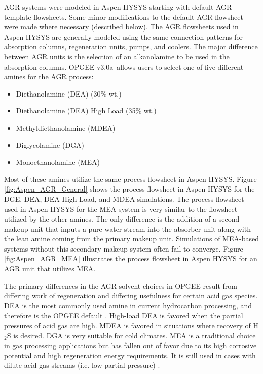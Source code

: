 \documentclass[11pt]{report}
\newcommand{\version}{v3.0a}
\begin{document}
AGR systems were modeled in Aspen HYSYS starting with default AGR template flowsheets. Some minor modifications to the default AGR flowsheet were made where necessary (described below). The AGR flowsheets used in Aspen HYSYS are generally modeled using the same connection patterns for absorption columns, regeneration units, pumps, and coolers. The major difference between AGR units is the selection of an alkanolamine to be used in the absorption columns. OPGEE \version \, allows users to select one of five different amines for the AGR process:
\begin{itemize}
 \item Diethanolamine (DEA) (30\% wt.)
\item Diethanolamine (DEA) High Load (35\% wt.)
 \item Methyldiethanolamine (MDEA)
\item Diglycolamine (DGA)
\item Monoethanolamine (MEA)
\end{itemize}
Most of these amines utilize the same process flowsheet in Aspen HYSYS. Figure \ref{fig:Aspen_AGR_General} shows the process flowsheet in Aspen HYSYS for the DGE, DEA, DEA High Load, and MDEA simulations.  The process flowsheet used in Aspen HYSYS for the MEA system is very similar to the flowsheet utilized by the other amines. The only difference is the addition of a second makeup unit that inputs a pure water stream into the absorber unit along with the lean amine coming from the primary makeup unit. Simulations of MEA-based systems without this secondary makeup system often fail to converge. Figure \ref{fig:Aspen_AGR_MEA} illustrates the process flowsheet in Aspen HYSYS for an AGR unit that utilizes MEA.

The primary differences in the AGR solvent choices in OPGEE result from differing work of regeneration and differing usefulness for certain acid gas species. DEA is the most commonly used amine in current hydrocarbon processing, and therefore is the OPGEE default \cite{Manning1991}. High-load DEA is favored when the partial pressures of acid gas are high.  MDEA is favored in situations where recovery of H$_2$S is desired.  DGA is very suitable for cold climates.  MEA is a traditional choice in gas processing applications but has fallen out of favor due to its high corrosive potential and high regeneration energy requirements. It is still used in cases with dilute acid gas streams (i.e. low partial pressure) \cite{Manning1991}.
\end{document}
